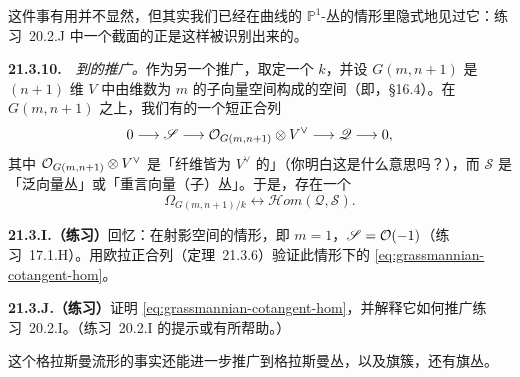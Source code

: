 这件事有用并不显然，但其实我们已经在曲线的 $\mathbb{P}^1$-丛的情形里隐式地见过它：\mbox{练习~20.2.J} 中一个截面的\trNormalBundle{}正是这样被识别出来的。

\textbf{21.3.10.}\ \extrahard\ \emph{到\trGrassmannian{}的推广。}\quad 作为另一个推广，取定一个\trBaseField{} $k$，并设 $G(m,n+1)$ 是 $(n+1)$ 维\trVectorSpace{} $V$ 中由维数为 $m$ 的子向量空间构成的空间（即\trGrassmannian，\S16.4）。在 $G(m,n+1)$ 之上，我们有\trLocallyFreeSheaf{}的一个短正合列
\[
0\longrightarrow\mathscr{S}\longrightarrow\mathcal{O}_{G(m,n+1)}\otimes V^{\vee}\longrightarrow\mathscr{Q}\longrightarrow 0,
\]
其中 $\mathcal{O}_{G(m,n+1)}\otimes V^{\vee}$ 是「纤维皆为 $V^{\vee}$ 的\trTrivialBundle{}」（你明白这是什么意思吗？），而 $\mathscr{S}$ 是「泛向量丛」或「重言向量（子）丛」。于是，存在一个\trCanonical{}\trIsomorphism
\begin{equation*}\tag{21.3.10.1}\label{eq:grassmannian-cotangent-hom}
\Omega_{G(m,n+1)/k}\longleftrightarrow\mathscr{H}om(\mathscr{Q},\mathscr{S}).
\end{equation*}

\textbf{21.3.I.（练习）}\quad 回忆：在射影空间的情形，即 $m=1$，$\mathscr{S}=\mathcal{O}(-1)$（\mbox{练习~17.1.H}）。用欧拉正合列（\mbox{定理~21.3.6}）验证此情形下的 \eqref{eq:grassmannian-cotangent-hom}。

\textbf{21.3.J.（练习）}\quad 证明 \eqref{eq:grassmannian-cotangent-hom}，并解释它如何推广\mbox{练习~20.2.I}。（\mbox{练习~20.2.I} 的提示或有所帮助。）

这个格拉斯曼流形的事实还能进一步推广到格拉斯曼丛，以及旗簇，还有旗丛。
